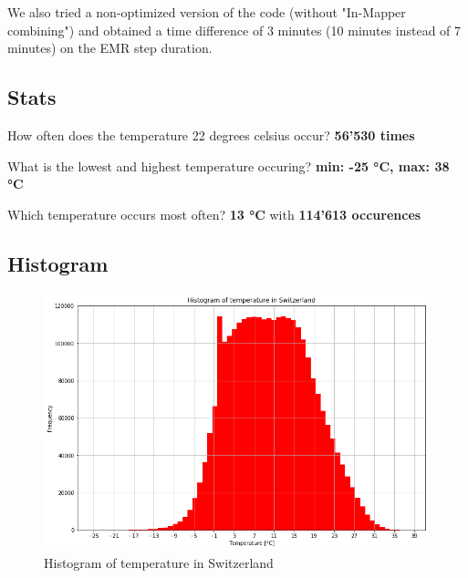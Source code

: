 \documentclass[a4paper]{article}
\begin{document}
	We also tried a non-optimized version of the code (without "In-Mapper combining") and obtained a time difference of 3 minutes (10 minutes instead of 7 minutes) on the EMR step duration.

	\subsection{Stats}
	How often does the temperature 22 degrees celsius occur? \textbf{56'530 times}

	What is the lowest and highest temperature occuring? \textbf{min: -25 °C, max: 38 °C}

	Which temperature occurs most often? \textbf{13 °C} with \textbf{114'613 occurences}

	\subsection{Histogram}
	\begin{figure}[H]
		\centering
		\includegraphics[width=\columnwidth]{ex03/temperature_histogram.png}
		\caption{Histogram of temperature in Switzerland}
		\label{fig:swiss-temp-histogram}
	\end{figure}
\end{document}

